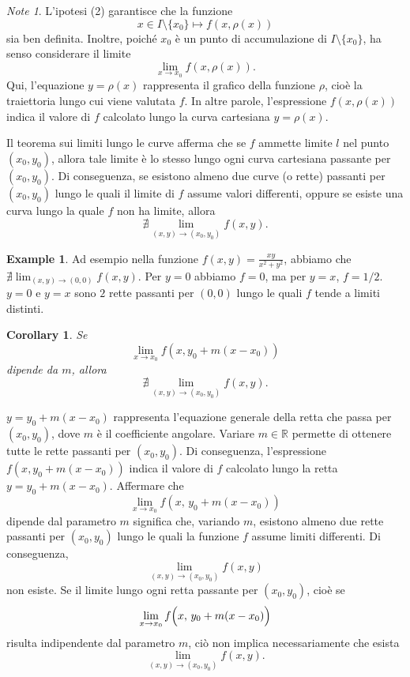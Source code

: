 \documentclass{article}
\theoremstyle{plain}
\newtheorem{cor}{Corollary}
\theoremstyle{definition}
\newtheorem{exmp}{Example}[section]
\theoremstyle{remark}
\newtheorem{note}{Note}
\begin{document}
\vspace{10pt}

\begin{note}
    L'ipotesi (2) garantisce che la funzione
    \[
    x \in I\setminus\{x_0\} \mapsto f(x,\rho(x))
    \]
    sia ben definita. Inoltre, poiché $x_0$ è un punto di accumulazione di $I\setminus\{x_0\}$, ha senso considerare il limite
    \[
    \lim_{x\to x_0} f(x,\rho(x)).
    \]
    Qui, l'equazione $y=\rho(x)$ rappresenta il grafico della funzione $\rho$, cioè la traiettoria lungo cui viene valutata $f$. In altre parole, l'espressione $f(x,\rho(x))$ indica il valore di $f$ calcolato lungo la curva cartesiana $y=\rho(x)$.
    
    Il teorema sui limiti lungo le curve afferma che se $f$ ammette limite $l$ nel punto $(x_0,y_0)$, allora tale limite è lo stesso lungo ogni curva cartesiana passante per $(x_0,y_0)$. Di conseguenza, se esistono almeno due curve (o rette) passanti per $(x_0,y_0)$ lungo le quali il limite di $f$ assume valori differenti, oppure se esiste una curva lungo la quale $f$ non ha limite, allora
    \[
    \nexists \lim_{(x,y)\to (x_0,y_0)} f(x,y).
    \]
\end{note}

\vspace{10pt}

\begin{exmp}
    Ad esempio nella funzione $f(x,y)=\frac{xy}{x^2+y^2}$, abbiamo che $\nexists\lim_{(x,y)\to(0,0)}f(x,y)$.
    Per $y=0$ abbiamo $f=0$, ma per $y=x$, $f=1/2$.
    $y=0$ e $y=x$ sono $2$ rette passanti per $(0,0)$ lungo le quali $f$ tende a limiti distinti.
\end{exmp}

\vspace{10pt}

\begin{bxthm}
\begin{cor}
    Se \[\lim_{x\to x_0}f(x,y_0+m(x-x_0))\] dipende da $m$, allora \[\nexists\lim_{(x,y)\to(x_0,y_0)}f(x,y).\]
\end{cor}
\end{bxthm}

\vspace{10pt}

$y = y_0 + m(x-x_0)$ rappresenta l'equazione generale della retta che passa per $(x_0, y_0)$, dove $m$ è il coefficiente angolare. 
Variare $m\in\mathbb{R}$ permette di ottenere tutte le rette passanti per $(x_0, y_0)$. 
Di conseguenza, l'espressione $f(x, y_0 + m(x-x_0))$ indica il valore di $f$ calcolato lungo la retta 
$y = y_0 + m(x-x_0)$.
Affermare che 
\[
\lim_{x\to x_0} f(x,\,y_0 + m(x-x_0))
\]
dipende dal parametro \( m \) significa che, variando \( m \), esistono almeno due rette passanti per \((x_0,y_0)\) lungo le quali la funzione \( f \) assume limiti differenti. Di conseguenza, 
\[
\lim_{(x,y)\to(x_0,y_0)} f(x,y)
\]
non esiste. Se il limite lungo ogni retta passante per $(x_0,y_0)$,
cioè se 
\[
\lim_{x\to x_0} f\Bigl(x,\,y_0+m(x-x_0)\Bigr)
\]
risulta indipendente dal parametro $m$, ciò non implica necessariamente che esista 
\[
\lim_{(x,y)\to (x_0,y_0)} f(x,y).
\]
\end{document}
